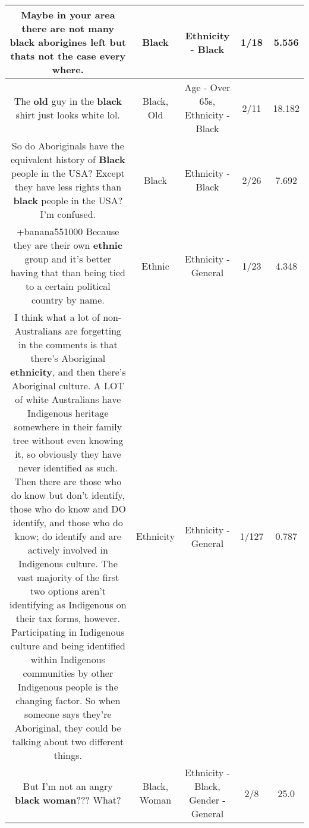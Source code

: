 \documentclass[11pt]{article}
\newlength\mylength
\begin{document}
\begin{center}
\begin{longtable}{|C{.65\mylength}|C{.30\mylength}|C{.12\mylength}|C{.12\mylength}|C{.12\mylength}|}
  \small Maybe in your area there are not many \textbf{black} aborigines left but thats not the case every where.\normalsize   & Black & Ethnicity - Black & 1/18 & 5.556 \\  \hline
  \small The \textbf{old} guy in the \textbf{black} shirt just looks white lol.\normalsize   & Black, Old & Age - Over 65s, Ethnicity - Black & 2/11 & 18.182 \\  \hline
  \small So do Aboriginals have the equivalent history of \textbf{Black} people in the USA? Except they have less rights than \textbf{black} people in the USA? I'm confused.\normalsize   & Black & Ethnicity - Black & 2/26 & 7.692 \\  \hline
  \small +banana551000 Because they are their own \textbf{ethnic} group and it's better having that than being tied to a certain political country by name.\normalsize   & Ethnic & Ethnicity - General & 1/23 & 4.348 \\  \hline
  \small I think what a lot of non-Australians are forgetting in the comments is that there's Aboriginal \textbf{ethnicity}, and then there's Aboriginal culture. A LOT of white Australians have Indigenous heritage somewhere in their family tree without even knowing it, so obviously they have never identified as such. Then there are those who do know but don't identify, those who do know and DO identify, and those who do know; do identify and are actively involved in Indigenous culture. The vast majority of the first two options aren't identifying as Indigenous on their tax forms, however. Participating in Indigenous culture and being identified within Indigenous communities by other Indigenous people is the changing factor. So when someone says they're Aboriginal, they could be talking about two different things.\normalsize   & Ethnicity & Ethnicity - General & 1/127 & 0.787 \\  \hline
  \small But I'm not an angry \textbf{black} \textbf{woman}??? What?\normalsize   & Black, Woman & Ethnicity - Black, Gender - General & 2/8 & 25.0 \\  \hline

\end{longtable}
\end{center}
\end{document}
